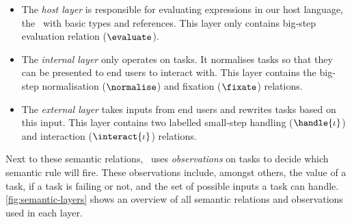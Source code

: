 \begin{itemize}
  \item
    The \emph{host layer} is responsible for evaluating expressions in our host language,
    the \STLC\ with basic types and references.
    This layer only contains big-step evaluation relation ($\evaluate$).
  \item
    The \emph{internal layer} only operates on tasks.
    It normalises tasks so that they can be presented to end users to interact with.
    This layer contains the big-step normalisation ($\normalise$) and fixation ($\fixate$) relations.
  \item
    The \emph{external layer} takes inputs from end users and rewrites tasks based on this input.
    This layer contains two labelled small-step handling ($\handle{\iota}$) and interaction ($\interact{\iota}$) relations.
\end{itemize}

Next to these semantic relations, \TOPHAT\ uses \emph{observations} on tasks to decide which semantic rule will fire.
These observations include, amongst others,
the value of a task,
if a task is failing or not,
and the set of possible inputs a task can handle.
\cref{fig:semantic-layers} shows an overview of all semantic relations and observations used in each layer.
